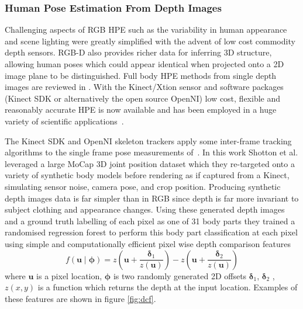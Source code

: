 \documentclass[11pt]{article} %
\begin{document}
\subsubsection{Human Pose Estimation From Depth Images}

Challenging aspects of RGB HPE such as the variability in human appearance and scene lighting were greatly simplified with the advent of low cost commodity depth sensors. RGB-D also provides richer data for inferring 3D structure, allowing human poses which could appear identical when projected onto a 2D image plane to be distinguished. Full body HPE methods from single depth images are reviewed in \cite{Helten2013}. With the Kinect/Xtion sensor and software packages (Kinect SDK or alternatively the open source OpenNI) low cost, flexible and reasonably accurate HPE is now available and has been employed in a huge variety of scientific applications~\cite{Han2013,Giovanni}.

The Kinect SDK and OpenNI skeleton trackers apply some inter-frame tracking algorithms to the single frame pose measurements of~\cite{Blake2011}. In this work Shotton et al. leveraged a large MoCap 3D joint position dataset which they re-targeted onto a variety of synthetic body models before rendering as if captured from a Kinect, simulating sensor noise, camera pose, and crop position. Producing synthetic depth images data is far simpler than in RGB since depth is far more invariant to subject clothing and appearance changes. Using these generated depth images and a ground truth labelling of each pixel as one of 31 body parts they trained a randomised regression forest to perform this body part classification at each pixel using simple and computationally efficient pixel wise depth comparison features 
\begin{equation}
f(\boldsymbol{u} \mid \boldsymbol{\phi}) = z(\boldsymbol{u}+\frac{\boldsymbol{\delta}_1}{z(\boldsymbol{u})})-z(\boldsymbol{u}+\frac{\boldsymbol{\delta}_2}{z(\boldsymbol{u})})
\label{eq:dcf}
\end{equation}
where $\boldsymbol{u}$ is a pixel location, $\boldsymbol{\phi}$ is two randomly generated 2D offsets $\boldsymbol{\delta}_1$, $\boldsymbol{\delta}_2$ , $z(x,y)$ is a function which returns the depth at the input location. Examples of these features are shown in figure \ref{fig:dcf}.
\end{document}
